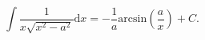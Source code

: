 $$
  \int \frac{1}{x \sqrt{x^2 - a^2 }} \mathrm{d}x
  = - \frac{1}{a} \mathrm{arcsin} \left ( \frac{a}{x} \right ) +
  C . 
  $$